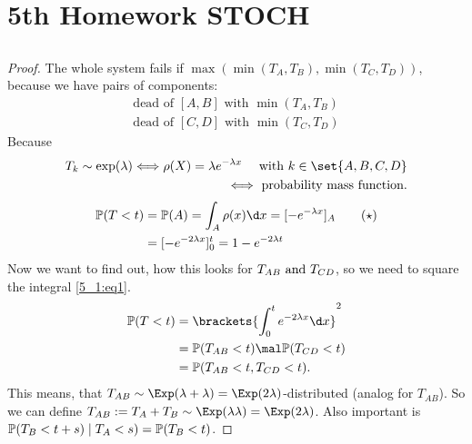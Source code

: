 
\section{5th Homework STOCH}
\subsection{}
\begin{proof} %
	The whole system fails if $\max(\min(T_A , T_B), \min(T_C, T_D))$, because we have pairs of components:
	\begin{align*}
		\text{dead of } [A,B] \text{ with } \min(T_A, T_B)\\
		\text{dead of } [C,D] \text{ with } \min(T_C, T_D)
	\end{align*}
	Because
	\begin{align*}
		T_k \sim \exp(\lambda) \Longleftrightarrow \rho(X) = \lambda e^{-\lambda x} \quad \with k \in \set{A,B,C,D}\\
		\Longleftrightarrow \text{ probability mass function}.
	\end{align*}
	\begin{align*} %
		\meas(T< t) &= \meas(A) = \int_A \rho(x) \d x = [-e^{-\lambda x}]_A \label{5_1:eq1}\tag{$\star$}\\
		&= [-e^{-2\lambda x}]_0^t = 1 - e^{-2\lambda t}
	\end{align*}
	Now we want to find out, how this looks for $T_{AB} \text{ and } T_{CD}$, so we need to square the integral \eqref{5_1:eq1}.
	\begin{align*}
		\meas(T<t) &= \brackets{\int_0^t e^{-2 \lambda x} \d x}^2 %
		\\
		&= \meas(T_{AB} < t) \mal \meas(T_{CD}<t)\\
		&= \meas(T_{AB} < t, T_{CD} < t).
	\end{align*} 
	This means, that $T_{AB} \sim \Exp(\lambda + \lambda) = \Exp(2\lambda)$-distributed (analog for $T_{AB}$). So we can define $T_{AB} := T_A + T_B \sim \Exp(\lambda \lambda) = \Exp(2\lambda)$. Also important is $\mathbb{P}(T_B < t+s) \mid T_A < s) = \mathbb{P}(T_B <t)$.
\end{proof}


